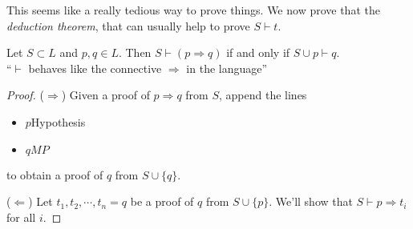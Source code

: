 \documentclass[a4paper]{article}
\begin{document}
This seems like a really tedious way to prove things. We now prove that the \emph{deduction theorem}, that can usually help to prove $S\vdash t$.

\begin{prop}
  Let $S\subset L$ and $p, q\in L$. Then $S\vdash (p\Rightarrow q)$ if and only if $S\cup {p} \vdash q$.\\

  ``$\vdash$ behaves like the connective $\Rightarrow $ in the language''
\end{prop}

\begin{proof}
  ($\Rightarrow $) Given a proof of $p\Rightarrow q$ from $S$, append the lines
  \begin{itemize}
    \item $p$\hfill Hypothesis
    \item $q$\hfill $MP$
  \end{itemize}
  to obtain a proof of $q$ from $S\cup \{q\}$.

  ($\Leftarrow$) Let $t_1, t_2, \cdots, t_n = q$ be a proof of $q$ from $S\cup \{p\}$. We'll show that $S\vdash p\Rightarrow t_i$ for all $i$.


\end{proof}
\end{document}
